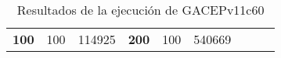 \begin{table}[H]
\begin{tabular}{|ccrccrccc}
\multicolumn{1}{|c|}{\multirow{-39}{*}{\cellcolor[HTML]{FFFFC7}\textbf{100}}} & \multicolumn{1}{c|}{\multirow{-9}{*}{\cellcolor[HTML]{DDFDFF}100}} & \multicolumn{1}{r|}{\cellcolor[HTML]{DAE8FC}114925}    & \multicolumn{1}{c|}{\multirow{-39}{*}{\cellcolor[HTML]{FFFFC7}\textbf{200}}} & \multicolumn{1}{c|}{\multirow{-10}{*}{\cellcolor[HTML]{DDFDFF}100}} & \multicolumn{1}{r|}{\cellcolor[HTML]{DDFDFF}540669}    &                                                                              &                                                                    &                                                        \\ \cline{1-6}
\end{tabular}
\caption{\label{res:GACEPv11c60}Resultados de la ejecución de GACEPv11c60}
\end{table}

